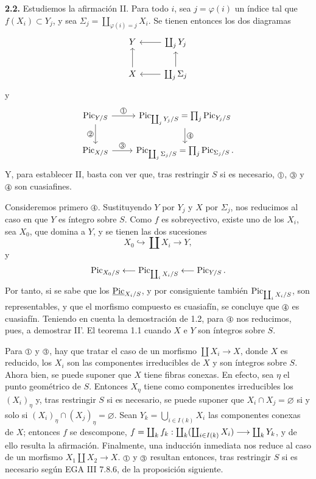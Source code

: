 \textbf{2.2.} Estudiemos la afirmación II. Para todo \(i\), sea
\(j=\varphi(i)\) un índice tal que \(f(X_i)\subset Y_j\), y sea
\(\Sigma_j=\coprod_{\varphi(i)=j} X_i\). Se tienen entonces los dos
diagramas
\[
\begin{tikzcd}
Y & \coprod_j Y_j \arrow[l]\\
X \arrow[u] & \coprod_j \Sigma_j \arrow[l] \arrow[u]
\end{tikzcd}
\]
y
\[
\begin{tikzcd}
\Pic_{Y/S} \arrow[r,"\sgacircled{1}"] \arrow[d,"\sgacircled{2}"'] &
\Pic_{\coprod_jY_j/S}=\prod_j\Pic_{Y_j/S} \arrow[d,"\sgacircled{4}"]\\
\Pic_{X/S} \arrow[r,"\sgacircled{3}"] &
\Pic_{\coprod_j\Sigma_j/S}=\prod_j\Pic_{\Sigma_j/S}.
\end{tikzcd}
\]
Y, para establecer II, basta con ver que, tras restringir \(S\) si es
necesario, \(\sgacircled{1}\), \(\sgacircled{3}\) y
\(\sgacircled{4}\) son cuasiafines.

Consideremos primero \(\sgacircled{4}\). Sustituyendo \(Y\) por \(Y_j\) y
\(X\) por \(\Sigma_j\), nos reducimos al caso en que \(Y\) es íntegro sobre
\(S\). Como \(f\) es sobreyectivo, existe uno de los \(X_i\), sea \(X_0\),
que domina a \(Y\), y se tienen las dos sucesiones
\[
  X_0\hookrightarrow \coprod X_i\longrightarrow Y,
\]
y
\[
  \Pic_{X_0/S}\longleftarrow \Pic_{\coprod_i\sisi{X'_i}{X_i}/S}\longleftarrow \Pic_{Y/S}. %
\]
Por tanto, si se sabe que los \(\underline{\Pic}_{X_i/S}\), y por consiguiente también
\(\Pic_{\coprod_iX_i/S}\), son representables, y que el morfismo compuesto
es cuasiafín, se concluye que \(\sgacircled{4}\) es cuasiafín. Teniendo en
cuenta la demostración de 1.2, para \(\sgacircled{4}\) nos reducimos, pues,
a demostrar II'. El teorema 1.1 cuando \(X\) e \(Y\) son íntegros sobre
\(S\).

Para \(\sgacircled{1}\) y \(\sgacircled{3}\), hay que tratar el caso de un
morfismo \(\coprod X_i\to X\), donde \(X\) es reducido, los \(X_i\) son las
componentes irreducibles de \(X\) y son íntegros sobre \(S\). Ahora bien, se
puede suponer que \(X\) tiene fibras conexas. En efecto, sea \(\eta\) el
punto geométrico de \(S\). Entonces \(X_\eta\) tiene como componentes
irreducibles los \((X_i)_\eta\) y, tras restringir \(S\) si es necesario, se
puede suponer que \(X_i\cap X_j=\varnothing\) si y solo si
\((X_i)_\eta\cap(X_j)_\eta=\varnothing\). Sean
\(Y_k=\bigcup_{i\in I(k)}X_i\) las componentes conexas de \(X\); entonces
\(f\) se descompone,
\(f=\coprod_k f_k:\coprod_k(\coprod_{i\in I(k)}X_i)\longrightarrow \sisi{Y_k}{\coprod_kY_k}\), y %
de ello resulta la afirmación. Finalmente, una inducción inmediata nos
reduce al caso de un morfismo \(X_1\amalg X_2\to X\).
\(\sgacircled{1}\) y \(\sgacircled{3}\) resultan entonces, tras restringir
\(S\) si es necesario según EGA III 7.8.6, de la proposición siguiente.

